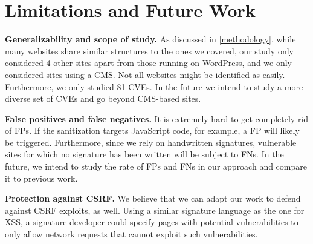 \section{Limitations and Future Work}

\textbf{Generalizability and scope of study.} As discussed in \autoref{methodology}, while many websites share similar structures to the ones we covered, our study only considered 4 other sites apart from those running on WordPress, and we only considered sites using a CMS. Not all websites might be identified as easily. Furthermore, we only studied 81 CVEs. %
In the future we intend to study a more diverse set of CVEs and go beyond CMS-based sites.

\textbf{False positives and false negatives.} It is extremely hard to get completely rid of FPs. If the sanitization targets JavaScript code, for example, a FP will likely be triggered. Furthermore, since we rely on handwritten signatures, vulnerable sites for which no signature has been written will be subject to FNs. In the future, we intend to study the rate of FPs and FNs in our approach and compare it to previous work.



\textbf{Protection against CSRF.} We believe that we can adapt our work to defend against \ac{CSRF} exploits, as well. Using a similar signature language as the one for \ac{XSS}, a signature developer could specify pages with potential vulnerabilities to only allow network requests that cannot exploit such vulnerabilities.

